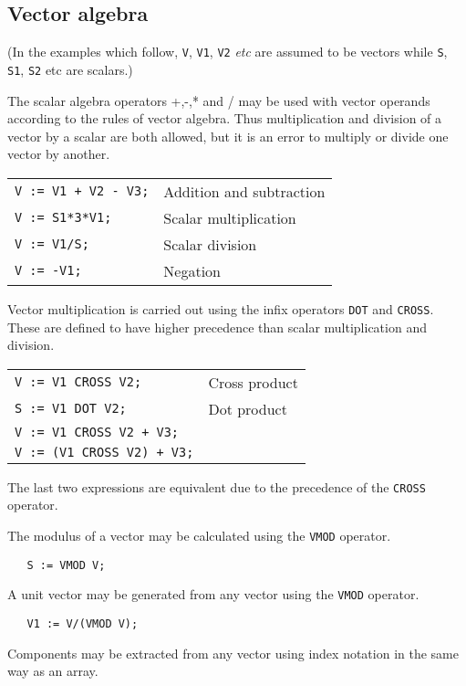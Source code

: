 \subsection{Vector algebra}

(In the examples which follow, {\tt V}, {\tt V1}, {\tt V2} {\em etc}
are assumed to be vectors while {\tt S}, {\tt S1}, {\tt S2} etc are scalars.)

The scalar algebra operators +,-,* and / may be used with
vector operands according to the rules of vector algebra.
Thus multiplication and division of a vector by a scalar
are both allowed, but it is an error to multiply or
divide one vector by another.

\begin{tabular}{l l}
{\tt V := V1 + V2 - V3;} & Addition and subtraction \\
{\tt V := S1*3*V1;} & Scalar multiplication \\
{\tt V := V1/S;} & Scalar division \\
{\tt V := -V1;} & Negation \\
\end{tabular}

  
\noindent Vector multiplication is carried out using the infix
operators {\tt DOT} and {\tt CROSS}. These are defined to have
higher precedence than scalar multiplication and
division.

\begin{tabular}{l l}
{\tt V := V1 CROSS V2;} & Cross product \\
{\tt S := V1 DOT V2;} & Dot product \\
{\tt V := V1 CROSS V2 + V3;} & \\
{\tt V := (V1 CROSS V2) + V3;} & \\
\end{tabular}

The last two expressions are equivalent due to the precedence of
the {\tt CROSS} operator.

The modulus of a vector may be calculated using the {\tt VMOD} operator.
\begin{verbatim}
   S := VMOD V;
\end{verbatim}
A unit vector may be generated from any vector using the {\tt VMOD}
operator.
\begin{verbatim}
   V1 := V/(VMOD V);
\end{verbatim}
Components may be extracted from any vector using index notation
in the same way as an array.


